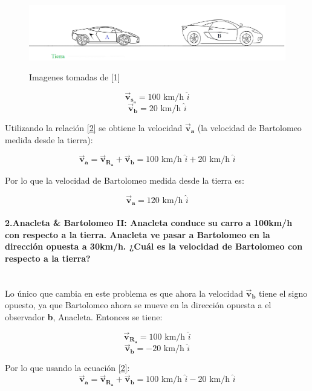 \documentclass[a4paper,11pt]{article}
\theoremstyle{mytheor}
\begin{document}
\begin{figure}[h]
	\includegraphics[width=.9\linewidth]{./im/c2}
	\label{fcN4}
	\caption{Imagenes tomadas de [1]}
\end{figure}


$$ \vec{\textbf{v}}_{\textbf{s}_\textbf{a}} = 100 \text{ km/h } \hat{i} $$
$$ \vec{\textbf{v}}_{\textbf{b}} = 20 \text{ km/h } \hat{i}$$ 


Utilizando la relación \ref{2} se obtiene la velocidad $\vec{\textbf{v}}_{\textbf{a}}$ (la velocidad de Bartolomeo medida desde la tierra):

\begin{equation}
\vec{\textbf{v}}_{\textbf{a}} = \vec{\textbf{v}}_{\textbf{R}_\textbf{a}} + \vec{\textbf{v}}_{\textbf{b}} = 100 \text{ km/h }\hat{i} + 20 \text{ km/h } \hat{i}
\end{equation}

Por lo que la velocidad de Bartolomeo medida desde la tierra es:

\begin{equation}
\vec{\textbf{v}}_{\textbf{a}}= 120 \text{ km/h } \hat{i}
\end{equation}


\paragraph{2.Anacleta \& Bartolomeo II: Anacleta conduce su carro a 100km/h con respecto a la tierra. Anacleta ve pasar a Bartolomeo en la dirección opuesta a 30km/h. ¿Cuál es la velocidad de Bartolomeo con respecto a la tierra?\\
	\\	}

Lo único que cambia en este problema es que ahora la velocidad $\vec{\textbf{v}}_{\textbf{b}}$ tiene el signo opuesto, ya que Bartolomeo ahora se mueve en la dirección opuesta a el observador \textbf{b}, Anacleta. Entonces se tiene:


$$ \vec{\textbf{v}}_{\textbf{R}_\textbf{a}} = 100 \text{ km/h } \hat{i} $$
$$ \vec{\textbf{v}}_{\textbf{b}} = -20 \text{ km/h } \hat{i}$$ 

Por lo que usando la ecuación \ref{2}:
\begin{equation}
\vec{\textbf{v}}_{\textbf{a}} = \vec{\textbf{v}}_{\textbf{R}_\textbf{a}} + \vec{\textbf{v}}_{\textbf{b}} = 100 \text{ km/h }\hat{i} - 20 \text{ km/h } \hat{i}
\end{equation}
\end{document}
